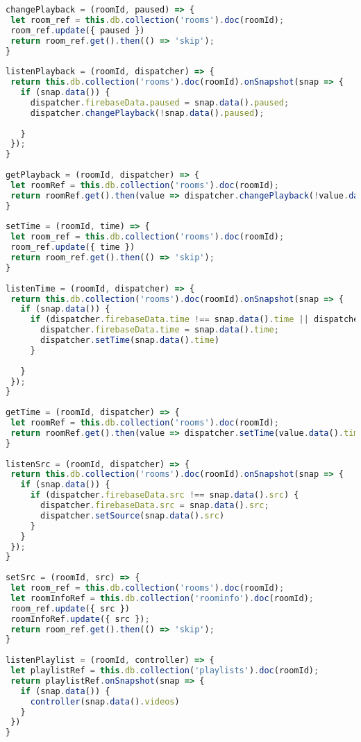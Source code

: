 \begin{lstlisting}[language=JavaScript,label={lst:firebase},caption={Методы для взаимодействия с Firebase}]
changePlayback = (roomId, paused) => {
 let room_ref = this.db.collection('rooms').doc(roomId);
 room_ref.update({ paused })
 return room_ref.get().then(() => 'skip');
}
 
listenPlayback = (roomId, dispatcher) => {
 return this.db.collection('rooms').doc(roomId).onSnapshot(snap => {
   if (snap.data()) {
     dispatcher.firebaseData.paused = snap.data().paused;
     dispatcher.changePlayback(!snap.data().paused);
 
   }
 });
}
 
getPlayback = (roomId, dispatcher) => {
 let roomRef = this.db.collection('rooms').doc(roomId);
 return roomRef.get().then(value => dispatcher.changePlayback(!value.data().paused));
}
 
setTime = (roomId, time) => {
 let room_ref = this.db.collection('rooms').doc(roomId);
 room_ref.update({ time })
 return room_ref.get().then(() => 'skip');
}
 
listenTime = (roomId, dispatcher) => {
 return this.db.collection('rooms').doc(roomId).onSnapshot(snap => {
   if (snap.data()) {
     if (dispatcher.firebaseData.time !== snap.data().time || dispatcher.firebaseData.src != snap.data().src) {
       dispatcher.firebaseData.time = snap.data().time;
       dispatcher.setTime(snap.data().time)
     }
 
   }
 });
}
 
getTime = (roomId, dispatcher) => {
 let roomRef = this.db.collection('rooms').doc(roomId);
 return roomRef.get().then(value => dispatcher.setTime(value.data().time || 0));
}
 
listenSrc = (roomId, dispatcher) => {
 return this.db.collection('rooms').doc(roomId).onSnapshot(snap => {
   if (snap.data()) {
     if (dispatcher.firebaseData.src !== snap.data().src) {
       dispatcher.firebaseData.src = snap.data().src;
       dispatcher.setSource(snap.data().src)
     }
   }
 });
}
 
setSrc = (roomId, src) => {
 let room_ref = this.db.collection('rooms').doc(roomId);
 let roomInfoRef = this.db.collection('roominfo').doc(roomId);
 room_ref.update({ src })
 roomInfoRef.update({ src });
 return room_ref.get().then(() => 'skip');
}
 
listenPlaylist = (roomId, controller) => {
 let playlistRef = this.db.collection('playlists').doc(roomId);
 return playlistRef.onSnapshot(snap => {
   if (snap.data()) {
     controller(snap.data().videos)
   }
 })
}
 

\end{lstlisting}
